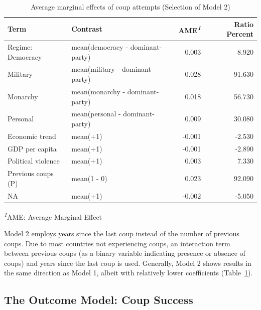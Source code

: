 \documentclass[
  12pt,
]{report}
\begin{document}
\begin{longtable}{@{\extracolsep{\fill}}llrr}

\caption{\label{tbl-mfx2}Average marginal effects of coup attempts
(Selection of Model 2)}

\tabularnewline

\toprule
Term & Contrast & AME\textsuperscript{\textit{1}} & Ratio Percent \\ 
\midrule\addlinespace[2.5pt]
Regime: Democracy & mean(democracy - dominant-party) & 0.003 & 8.920 \\ 
{\hspace{47.25pt}Military} & mean(military - dominant-party) & 0.028 & 91.630 \\ 
{\hspace{47.25pt}Monarchy} & mean(monarchy - dominant-party) & 0.018 & 56.730 \\ 
{\hspace{47.25pt}Personal} & mean(personal - dominant-party) & 0.009 & 30.080 \\ 
Economic trend & mean(+1) & -0.001 & -2.530 \\ 
GDP per capita & mean(+1) & -0.001 & -2.890 \\ 
Political violence & mean(+1) & 0.003 & 7.330 \\ 
Previous coups (P) & mean(1 - 0) & 0.023 & 92.090 \\ 
NA & mean(+1) & -0.002 & -5.050 \\ 
\bottomrule

\end{longtable}

\begin{minipage}{\linewidth}
\textsuperscript{\textit{1}}AME: Average Marginal Effect\\
\end{minipage}
\endgroup

Model 2 employs years since the last coup instead of the number of
previous coups. Due to most countries not experiencing coups, an
interaction term between previous coups (as a binary variable indicating
presence or absence of coups) and years since the last coup is used.
Generally, Model 2 shows results in the same direction as Model 1,
albeit with relatively lower coefficients (Table~\ref{tbl-mfx2}).

\subsection{The Outcome Model: Coup
Success}\label{the-outcome-model-coup-success}
\end{document}
